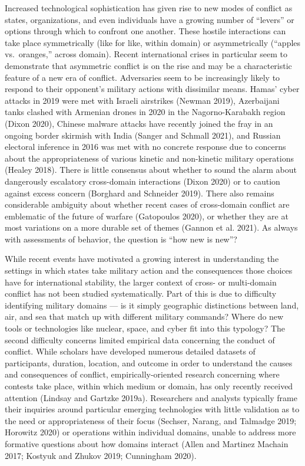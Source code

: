 \documentclass[
]{article}
\begin{document}
Increased technological sophistication has given rise to new modes of conflict as states, organizations, and even individuals have a growing number of ``levers'' or options through which to confront one another. These hostile interactions can take place symmetrically (like for like, within domain) or asymmetrically (``apples vs.~oranges,'' across domain). Recent international crises in particular seem to demonstrate that asymmetric conflict is on the rise and may be a characteristic feature of a new era of conflict. Adversaries seem to be increasingly likely to respond to their opponent's military actions with dissimilar means. Hamas' cyber attacks in 2019 were met with Israeli airstrikes (Newman 2019), Azerbaijani tanks clashed with Armenian drones in 2020 in the Nagorno-Karabakh region (Dixon 2020), Chinese malware attacks have recently joined the fray in an ongoing border skirmish with India (Sanger and Schmall 2021), and Russian electoral inference in 2016 was met with no concrete response due to concerns about the appropriateness of various kinetic and non-kinetic military operations (Healey 2018). There is little consensus about whether to sound the alarm about dangerously escalatory cross-domain interactions (Dixon 2020) or to caution against excess concern (Borghard and Schneider 2019). There also remains considerable ambiguity about whether recent cases of cross-domain conflict are emblematic of the future of warfare (Gatopoulos 2020), or whether they are at most variations on a more durable set of themes (Gannon et al. 2021). As always with assessments of behavior, the question is ``how new is new''?

While recent events have motivated a growing interest in understanding the settings in which states take military action and the consequences those choices have for international stability, the larger context of cross- or multi-domain conflict has not been studied systematically. Part of this is due to difficulty identifying military domains --- is it simply geographic distinctions between land, air, and sea that match up with different military commands? Where do new tools or technologies like nuclear, space, and cyber fit into this typology? The second difficulty concerns limited empirical data concerning the conduct of conflict. While scholars have developed numerous detailed datasets of participants, duration, location, and outcome in order to understand the causes and consequences of conflict, empirically-oriented research concerning where contests take place, within which medium or domain, has only recently received attention (Lindsay and Gartzke 2019a). Researchers and analysts typically frame their inquiries around particular emerging technologies with little validation as to the need or appropriateness of their focus (Sechser, Narang, and Talmadge 2019; Horowitz 2020) or operations within individual domains, unable to address more formative questions about how domains interact (Allen and Martinez Machain 2017; Kostyuk and Zhukov 2019; Cunningham 2020).
\end{document}
